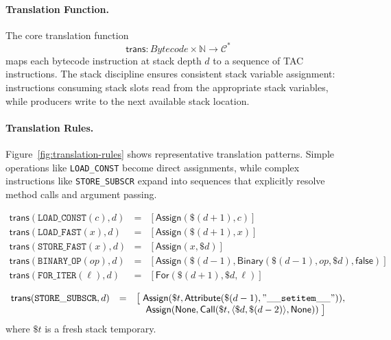 \paragraph{Translation Function.}
The core translation function
\[
\mathsf{trans} : Bytecode \times \mathbb{N} \to \mathcal{C}^*
\]
maps each bytecode instruction at stack depth $d$ to a sequence of TAC instructions. The stack discipline ensures consistent stack variable assignment: instructions consuming stack slots read from the appropriate stack variables, while producers write to the next available stack location.

\paragraph{Translation Rules.}
Figure~\ref{fig:translation-rules} shows representative translation patterns. Simple operations like \texttt{LOAD_CONST} become direct assignments, while complex instructions like \texttt{STORE_SUBSCR} expand into sequences that explicitly resolve method calls and argument passing.

\begin{figure*}[t]
\centering
\[
\begin{array}{rcl}
\mathsf{trans}(\mathtt{LOAD\_CONST}(c), d) 
  &=& [\mathsf{Assign}(\$(d+1), c)] \\[1ex]

\mathsf{trans}(\mathtt{LOAD\_FAST}(x), d) 
  &=& [\mathsf{Assign}(\$(d+1), x)] \\[1ex]

\mathsf{trans}(\mathtt{STORE\_FAST}(x), d) 
  &=& [\mathsf{Assign}(x, \$d)] \\[1ex]

\mathsf{trans}(\mathtt{BINARY\_OP}(op), d) 
  &=& [\mathsf{Assign}(\$(d-1), \mathsf{Binary}(\$(d-1), op, \$d), \mathsf{false})] \\[1ex]

\mathsf{trans}(\mathtt{FOR\_ITER}(\ell), d) 
  &=& [\mathsf{For}(\$(d+1), \$d, \ell)]
\end{array}
\]

\[
\begin{array}{rcl}
\mathsf{trans}(\mathtt{STORE\_SUBSCR}, d) 
  &=& \big[ \;
     \mathsf{Assign}(\$t, \mathsf{Attribute}(\$(d-1),\mathtt{"\_\_setitem\_\_"})), \\ 
  && \quad \mathsf{Assign}(\mathsf{None}, 
             \mathsf{Call}(\$t, \langle \$d, \$(d-2)\rangle, \mathsf{None})) 
     \;\big]
\end{array}
\]
where $\$t$ is a fresh stack temporary.

\caption{Translation Rules from Bytecode to TAC}
\label{fig:translation-rules}
\end{figure*}

